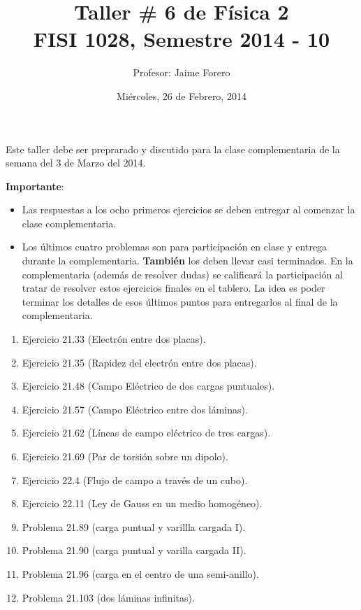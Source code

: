 \documentclass{article}
\title{Taller \# 6 de F\'isica 2\\ FISI 1028, Semestre 2014 - 10}
\author{Profesor: Jaime Forero}
\date{Mi\'ercoles, 26 de Febrero, 2014}
\begin{document}
\maketitle
\thispagestyle{empty}

\noindent

Este taller debe ser preprarado y discutido para la clase
complementaria de la semana del 3 de Marzo del 2014. 

\noindent
{\bf Importante}:
\begin{itemize}

\item
Las respuestas a los ocho primeros ejercicios se deben entregar al comenzar la
clase complementaria. 
\item 
Los \'ultimos cuatro problemas son para participaci\'on en clase y entrega
durante la complementaria. {\bf{Tambi\'en}} los deben llevar casi
terminados. En la complementaria (adem\'as de resolver dudas) se
calificar\'a la participaci\'on al tratar de resolver estos ejercicios
finales en el tablero. La idea es poder terminar los  detalles de esos
\'ultimos puntos para entregarlos al final de la complementaria.
\end{itemize}

\begin{enumerate}

\item
Ejercicio 21.33 (Electr\'on entre dos placas).

\item
Ejercicio 21.35 (Rapidez del electr\'on entre dos placas).

\item
Ejercicio 21.48 (Campo El\'ectrico de dos cargas puntuales).

\item
Ejercicio 21.57 (Campo El\'ectrico entre dos l\'aminas).

\item
Ejercicio 21.62 (L\'ineas de campo el\'ectrico de tres cargas).

\item 
Ejercicio 21.69 (Par de torsi\'on sobre un dipolo).

\item
Ejercicio 22.4 (Flujo de campo a trav\'es de un cubo).

\item 
Ejercicio 22.11 (Ley de Gauss en un medio homog\'eneo).

\item 
Problema 21.89 (carga puntual y varillla cargada I).

\item
Problema 21.90 (carga puntual y varilla cargada II).

\item 
Problema 21.96 (carga en el centro de una semi-anillo).

\item
Problema 21.103 (dos l\'aminas infinitas).
\end{enumerate}
\end{document}
